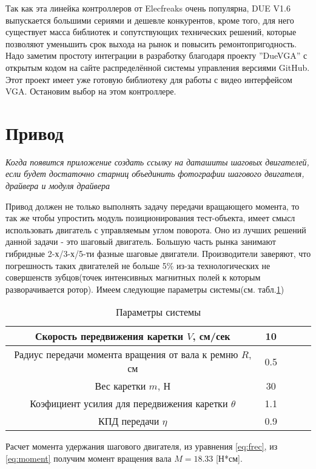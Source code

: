 Так как эта линейка контроллеров от Elecfreaks очень популярна, DUE V1.6 выпускается большими сериями и дешевле конкурентов, кроме того, для него существует масса библиотек и сопутствующих технических решений, которые позволяют уменьшить срок выхода на рынок и повысить ремонтопригодность. Надо заметим простоту интеграции в разработку благодаря проекту ''DueVGA'' с открытым кодом на сайте распределённой системы управления версиями GitHub\cite{s_2}. Этот проект имеет уже готовую библиотеку для работы с видео интерфейсом VGA. Остановим выбор на этом контроллере.

\section{Привод}
\textit{Когда появится приложение создать ссылку на даташиты шаговых двигателей, если будет достаточно старниц объединить фотографии шагового двигателя, драйвера и модуля драйвера}

Привод должен не только выполнять задачу передачи вращающего момента, то так же чтобы упростить модуль позиционирования тест-объекта, имеет смысл использовать двигатель с управляемым углом поворота. Оно из лучших решений данной задачи - это шаговый двигатель. Большую часть рынка занимают гибридные 2-х/3-х/5-ти фазные шаговые двигатели. Производители заверяют, что погрешность таких двигателей не больше 5\% из-за технологических не совершенств зубцов(точек интенсивных магнитных полей к которым разворачивается ротор).
Имеем следующие параметры системы(см. табл.\ref{tab:MechParamSys})

\begin{table}[ht]
\centering
\begin{tabular}{|c|c|c|c|c|}
\hline 
Скорость передвижения каретки $V$, см/сек & 10\\
\hline 
Радиус передачи момента вращения от вала к ремню $R$, см & 0.5\\
\hline 
Вес каретки $m$, Н & 30\\
\hline 
Коэфициент усилия для передвижения каретки $\theta$ & 1.1\\
\hline 
КПД передачи $\eta$ & 0.9 \\
\hline 

\end{tabular} 
\caption{Параметры системы}
\label{tab:MechParamSys}
\end{table}
Расчет момента удержания шагового двигателя, из уравнения \ref{eq:frec}, из \ref{eq:moment} получим момент вращения вала $M=18.33$ [Н*см].

